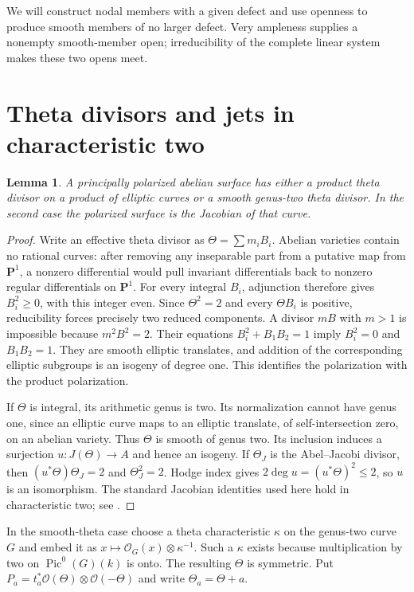 \documentclass[11pt]{article}
\newtheorem{lemma}[theorem]{Lemma}
\theoremstyle{definition}\newtheorem{definition}[theorem]{Definition}
\theoremstyle{remark}\newtheorem{remark}[theorem]{Remark}
\newcommand{\OO}{\mathcal O}
\newcommand{\PP}{\mathbf P}
\newcommand{\Pic}{\operatorname{Pic}}
\begin{document}
We will construct nodal members with a given defect and use openness to produce smooth members of no larger defect. Very ampleness supplies a nonempty smooth-member open; irreducibility of the complete linear system makes these two opens meet.

\section{Theta divisors and jets in characteristic two}

\begin{lemma}\label{lem:dichotomy}
A principally polarized abelian surface has either a product theta divisor on a product of elliptic curves or a smooth genus-two theta divisor. In the second case the polarized surface is the Jacobian of that curve.
\end{lemma}
\begin{proof}
Write an effective theta divisor as $\Theta=\sum m_iB_i$. Abelian varieties contain no rational curves: after removing any inseparable part from a putative map from $\PP^1$, a nonzero differential would pull invariant differentials back to nonzero regular differentials on $\PP^1$. For every integral $B_i$, adjunction therefore gives $B_i^2\ge0$, with this integer even. Since $\Theta^2=2$ and every $\Theta B_i$ is positive, reducibility forces precisely two reduced components. A divisor $mB$ with $m>1$ is impossible because $m^2B^2=2$. Their equations $B_i^2+B_1B_2=1$ imply $B_i^2=0$ and $B_1B_2=1$. They are smooth elliptic translates, and addition of the corresponding elliptic subgroups is an isogeny of degree one. This identifies the polarization with the product polarization.

If $\Theta$ is integral, its arithmetic genus is two. Its normalization cannot have genus one, since an elliptic curve maps to an elliptic translate, of self-intersection zero, on an abelian variety. Thus $\Theta$ is smooth of genus two. Its inclusion induces a surjection $u:J(\Theta)\to A$ and hence an isogeny. If $\Theta_J$ is the Abel--Jacobi divisor, then $(u^*\Theta)\Theta_J=2$ and $\Theta_J^2=2$. Hodge index gives $2\deg u=(u^*\Theta)^2\le2$, so $u$ is an isomorphism. The standard Jacobian identities used here hold in characteristic two; see \citet[Theorem~14.23, Corollary~14.24, pp.~230--231; Theorem~14.29, p.~233; Example~14.34, pp.~236--237]{EGM}.
\end{proof}

In the smooth-theta case choose a theta characteristic $\kappa$ on the genus-two curve $G$ and embed it as $x\mapsto\OO_G(x)\otimes\kappa^{-1}$. Such a $\kappa$ exists because multiplication by two on $\Pic^0(G)(k)$ is onto. The resulting $\Theta$ is symmetric. Put $P_a=t_a^*\OO(\Theta)\otimes\OO(-\Theta)$ and write $\Theta_a=\Theta+a$.
\end{document}

